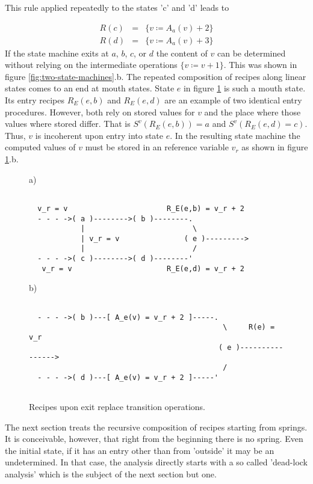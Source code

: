 \documentclass[12pt,a4paper]{scrartcl}
\begin{document}
This rule applied repeatedly to the states 'c' and 'd' leads to

\begin{eqnarray}
    R(c) &=&\{ v \coloneqq  A_a(v) + 2 \} \\
    R(d) &=&\{ v \coloneqq  A_a(v) + 3 \}                                 
\end{eqnarray}
If the state machine exits at $a$, $b$, $c$, or $d$ the content of $v$ can be
determined without relying on the intermediate operations $\{ v\coloneqq v+1 \}$. This
was shown in figure \ref{fig:two-state-machines}.b. 
The repeated composition of recipes along linear states comes to an end at
mouth states. State $e$ in figure \ref{fig:interference-example} is such a
mouth state. Its entry recipes $R_E(e,b)$ and $R_E(e,d)$ are an example of two
identical entry procedures. However, both rely on stored values for $v$ and the
place where those values where stored differ. That is $S^v(R_E(e,b))=a$ and
$S^v(R_E(e,d)=c)$. Thus, $v$ is incoherent upon entry into state $e$.  In
the resulting state machine the computed values of $v$ must be stored in an
reference variable $v_r$ as shown in figure \ref{fig:interference-example}.b.
\begin{figure}[htbp] \leavevmode \label{fig:interference-example}
a)
\begin{verbatim}

  v_r = v                       R_E(e,b) = v_r + 2
  - - - ->( a )-------->( b )--------.
            |                         \
            | v_r = v               ( e )--------->
            |                         /
  - - - ->( c )-------->( d )--------'
   v_r = v                      R_E(e,d) = v_r + 2

\end{verbatim}
b)
\begin{verbatim}
                                 
  - - - ->( b )---[ A_e(v) = v_r + 2 ]-----.
                                             \     R(e) = v_r
                                            ( e )---------------->
                                             /
  - - - ->( d )---[ A_e(v) = v_r + 2 ]-----'
                                 

\end{verbatim}
\caption{Recipes upon exit replace transition operations.}
\end{figure}

The next section treats the recursive composition of recipes starting from
springs.  It is conceivable, however, that right from the beginning there is no
spring.  Even the initial state, if it has an entry other than from 'outside'
it may be an undetermined.  In that case, the analysis directly starts with a
so called 'dead-lock analysis' which is the subject of the next section but
one.
\end{document}
